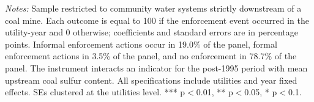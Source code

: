 \begin{table}[htbp]
\begin{minipage}{14.5cm}
\vspace{4pt}
\footnotesize
\raggedright
\textit{Notes:} Sample restricted to community water systems strictly downstream of a coal mine. Each outcome is equal to 100 if the enforcement event occurred in the utility-year and 0 otherwise; coefficients and standard errors are in percentage points. Informal enforcement actions occur in 19.0\% of the panel, formal enforcement actions in 3.5\% of the panel, and no enforcement in 78.7\% of the panel. The instrument interacts an indicator for the post-1995 period with mean upstream coal sulfur content. All specifications include utilities and year fixed effects. SEs clustered at the utilities level. *** p$<$0.01, ** p$<$0.05, * p$<$0.1.
\end{minipage}
\end{table}
